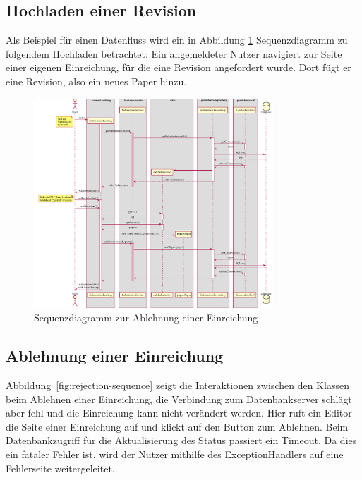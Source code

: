 
\subsection{Hochladen einer Revision}\label{subsec:sequenz-revision-hochladen}

Als Beispiel für einen Datenfluss wird ein in Abbildung \ref{fig:upload-revision-sequence} Sequenzdiagramm zu folgendem Hochladen betrachtet:
Ein angemeldeter Nutzer navigiert zur Seite einer eigenen Einreichung, für die eine Revision angefordert wurde.
Dort fügt er eine Revision, also ein neues Paper hinzu.

\begin{figure}[H]
    \centering
    \includegraphics[width=0.8\textwidth]{graphics/upload_revision}
    \caption{Sequenzdiagramm zur Ablehnung einer Einreichung}
    \label{fig:upload-revision-sequence}
\end{figure}

\subsection{Ablehnung einer Einreichung}\label{subsec:sequenz-ablehnung}

Abbildung~\ref{fig:rejection-sequence} zeigt die Interaktionen zwischen den Klassen beim Ablehnen einer Einreichung, die Verbindung zum Datenbankserver schlägt aber fehl und die Einreichung kann nicht verändert werden.
Hier ruft ein Editor die Seite einer Einreichung auf und klickt auf den Button zum Ablehnen.
Beim Datenbankzugriff für die Aktualisierung des Status passiert ein Timeout.
Da dies ein fataler Fehler ist, wird der Nutzer mithilfe des ExceptionHandlers auf eine Fehlerseite weitergeleitet.

